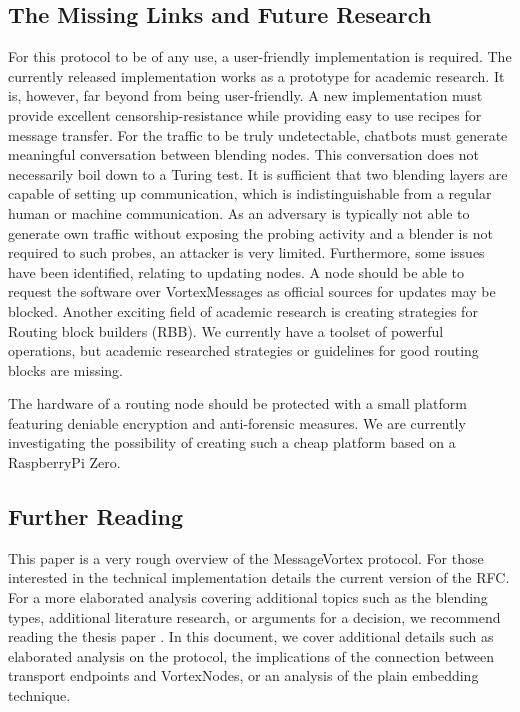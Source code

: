 \documentclass[10pt,journal,compsoc,twocolumn,twoside]{IEEEtran}
\begin{document}
\subsection{The Missing Links and Future Research}
For this protocol to be of any use, a user-friendly implementation is required. The currently released implementation works as a prototype for academic research. It is, however, far beyond from being user-friendly. A new implementation must provide excellent censorship-resistance while providing easy to use recipes for message transfer.  For the traffic to be truly undetectable, chatbots must generate meaningful conversation between blending nodes. This conversation does not necessarily boil down to a Turing test. It is sufficient that two blending layers are capable of setting up communication, which is indistinguishable from a regular human or machine communication. As an adversary is typically not able to generate own traffic without exposing the probing activity and a blender is not required to such probes, an attacker is very limited. Furthermore, some issues have been identified, relating to updating nodes. A node should be able to request the software over VortexMessages as official sources for updates may be blocked. Another exciting field of academic research is creating strategies for Routing block builders (RBB). We currently have a toolset of powerful operations, but academic researched strategies or guidelines for good routing blocks are missing. 

The hardware of a routing node should be protected with a small platform featuring deniable encryption and anti-forensic measures. We are currently investigating the possibility of creating such a cheap platform based on a RaspberryPi Zero.

\subsection{Further Reading}
This paper is a very rough overview of the MessageVortex protocol. For those interested in the technical implementation details the current version of the RFC\cite{MessageVortexRFC}. For a more elaborated analysis covering additional topics such as the blending types, additional literature research, or arguments for a decision, we recommend reading the thesis paper \cite{messageVortex}. In this document, we cover additional details such as elaborated analysis on the protocol, the implications of the connection between transport endpoints and VortexNodes, or an analysis of the plain embedding technique.
\end{document}
